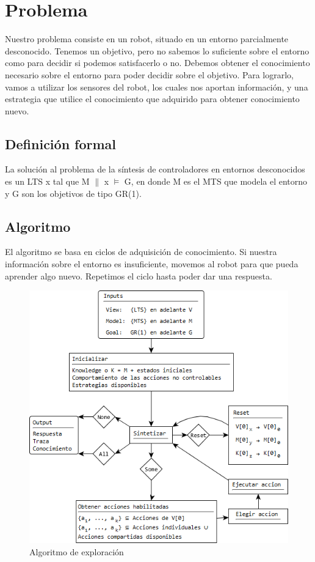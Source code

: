\chapter{Problema}

Nuestro problema consiste en un robot, situado en un entorno parcialmente desconocido. Tenemos un objetivo, pero no 
sabemos lo suficiente sobre el entorno como para decidir si podemos satisfacerlo o no.
Debemos obtener el conocimiento necesario sobre el entorno para poder decidir sobre el objetivo. Para lograrlo, vamos
a utilizar los sensores del robot, los cuales nos aportan información, y una estrategia que utilice
el conocimiento que adquirido para obtener conocimiento nuevo.

\section{Definición formal}

La solución al problema de la síntesis de controladores en entornos desconocidos es un LTS x tal que M $\parallel$ x $\models$ G, 
en donde M es el MTS que modela el entorno y G son los objetivos de tipo GR(1).

\section{Algoritmo}

El algoritmo se basa en ciclos de adquisición de conocimiento. Si nuestra información sobre el entorno es insuficiente,
movemos al robot para que pueda aprender algo nuevo. Repetimos el ciclo hasta poder dar una respuesta.

\begin{figure}[H]
  \centering
    \includegraphics{Imagenes/Algoritmo/Algoritmo.png}
  \caption{Algoritmo de exploración}
  \label{fig:Algoritmo}
\end{figure}

